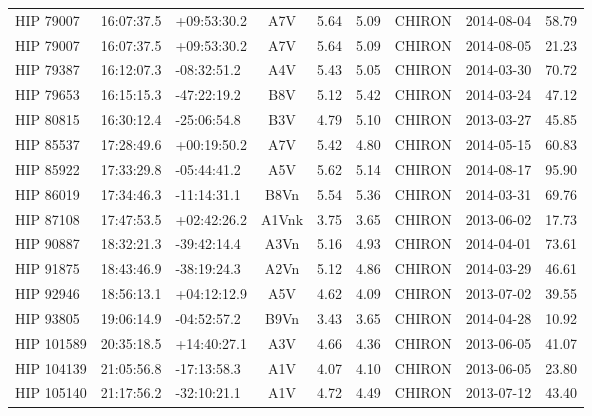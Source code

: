\begin{scriptsize}
\begin{longtable}{lllcccrcc}
   HIP 79007 &  16:07:37.5 &  +09:53:30.2 &            A7V &     5.64 &     5.09 &     CHIRON &  2014-08-04 &           58.79 \\
   HIP 79007 &  16:07:37.5 &  +09:53:30.2 &            A7V &     5.64 &     5.09 &     CHIRON &  2014-08-05 &           21.23 \\
   HIP 79387 &  16:12:07.3 &  -08:32:51.2 &            A4V &     5.43 &     5.05 &     CHIRON &  2014-03-30 &           70.72 \\
   HIP 79653 &  16:15:15.3 &  -47:22:19.2 &            B8V &     5.12 &     5.42 &     CHIRON &  2014-03-24 &           47.12 \\
   HIP 80815 &  16:30:12.4 &  -25:06:54.8 &            B3V &     4.79 &     5.10 &     CHIRON &  2013-03-27 &           45.85 \\
   HIP 85537 &  17:28:49.6 &  +00:19:50.2 &            A7V &     5.42 &     4.80 &     CHIRON &  2014-05-15 &           60.83 \\
   HIP 85922 &  17:33:29.8 &  -05:44:41.2 &            A5V &     5.62 &     5.14 &     CHIRON &  2014-08-17 &           95.90 \\
   HIP 86019 &  17:34:46.3 &  -11:14:31.1 &           B8Vn &     5.54 &     5.36 &     CHIRON &  2014-03-31 &           69.76 \\
   HIP 87108 &  17:47:53.5 &  +02:42:26.2 &        A1Vnk &     3.75 &     3.65 &     CHIRON &  2013-06-02 &           17.73 \\
   HIP 90887 &  18:32:21.3 &  -39:42:14.4 &           A3Vn &     5.16 &     4.93 &     CHIRON &  2014-04-01 &           73.61 \\
   HIP 91875 &  18:43:46.9 &  -38:19:24.3 &           A2Vn &     5.12 &     4.86 &     CHIRON &  2014-03-29 &           46.61 \\
   HIP 92946 &  18:56:13.1 &  +04:12:12.9 &            A5V &     4.62 &     4.09 &     CHIRON &  2013-07-02 &           39.55 \\
   HIP 93805 &  19:06:14.9 &  -04:52:57.2 &           B9Vn &     3.43 &     3.65 &     CHIRON &  2014-04-28 &           10.92 \\
  HIP 101589 &  20:35:18.5 &  +14:40:27.1 &            A3V &     4.66 &     4.36 &     CHIRON &  2013-06-05 &           41.07 \\
  HIP 104139 &  21:05:56.8 &  -17:13:58.3 &            A1V &     4.07 &     4.10 &     CHIRON &  2013-06-05 &           23.80 \\
  HIP 105140 &  21:17:56.2 &  -32:10:21.1 &            A1V &     4.72 &     4.49 &     CHIRON &  2013-07-12 &           43.40 \\

\end{longtable}
\end{scriptsize}

